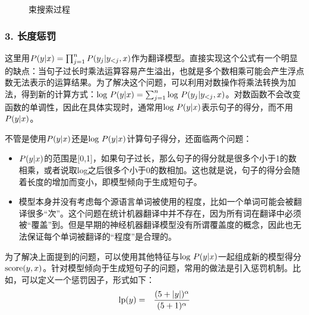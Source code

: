 \begin{figure}[htp]
\centering

\caption{束搜索过程}
\label{fig:10-31}
\end{figure}


\subsubsection{3. 长度惩罚}

\parinterval 这里用$ {P} ({{y}} | {{x}}) = \prod_{j=1}^n {P}(y_j | {{y}}_{<j},{{x}}) $作为翻译模型。直接实现这个公式有一个明显的缺点：当句子过长时乘法运算容易产生溢出，也就是多个数相乘可能会产生浮点数无法表示的运算结果。为了解决这个问题，可以利用对数操作将乘法转换为加法，得到新的计算方式：$\textrm{log } {P}({{y}} | {{x}}) = \sum_{j=1}^n \textrm{log }{P} (y_j | {{y}}_{<j}, {{x}}) $。对数函数不会改变函数的单调性，因此在具体实现时，通常用$\textrm{log }{P} ({{y}} | {{x}})$表示句子的得分，而不用${P}({{y}} | {{x}})$。

\parinterval 不管是使用${P}({{y}} | {{x}})$还是$\textrm{log } {P}({{y}} | {{x}})$计算句子得分，还面临两个问题：

\begin{itemize}
\vspace{0.5em}
\item ${P}({{y}} | {{x}})$的范围是[0,1]，如果句子过长，那么句子的得分就是很多个小于1的数相乘，或者说取log之后很多个小于0的数相加。这也就是说，句子的得分会随着长度的增加而变小，即模型倾向于生成短句子。
\vspace{0.5em}
\item 模型本身并没有考虑每个源语言单词被使用的程度，比如一个单词可能会被翻译很多“次”。这个问题在统计机器翻译中并不存在，因为所有词在翻译中必须被“覆盖”到。但是早期的神经机器翻译模型没有所谓覆盖度的概念，因此也无法保证每个单词被翻译的“程度”是合理的。
\vspace{0.5em}
\end{itemize}

\parinterval 为了解决上面提到的问题，可以使用其他特征与$\textrm{log } {P} ({{y}} | {{x}})$一起组成新的模型得分$\textrm{score} ( {{y}} , {{x}})$。针对模型倾向于生成短句子的问题，常用的做法是引入惩罚机制。比如，可以定义一个惩罚因子，形式如下：
\begin{eqnarray}
\textrm{lp}({{y}}) &=& \frac {(5+ |{{y}}|)^{\alpha}} {(5+1)^{\alpha}}
\label{eq:10-33}
\end{eqnarray}

